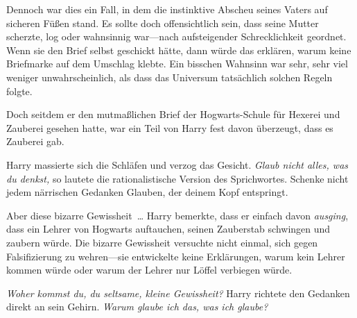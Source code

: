 Dennoch war dies ein Fall, in dem die instinktive Abscheu seines Vaters auf sicheren Füßen stand. Es sollte doch offensichtlich sein, dass seine Mutter scherzte, log oder wahnsinnig war—nach aufsteigender Schrecklichkeit geordnet. Wenn sie den Brief selbst geschickt hätte, dann würde das erklären, warum keine Briefmarke auf dem Umschlag klebte. Ein bisschen Wahnsinn war sehr, sehr viel weniger unwahrscheinlich, als dass das Universum tatsächlich solchen Regeln folgte.

Doch seitdem er den mutmaßlichen Brief der Hogwarts-Schule für Hexerei und Zauberei gesehen hatte, war ein Teil von Harry fest davon überzeugt, dass es Zauberei gab.

Harry massierte sich die Schläfen und verzog das Gesicht. \emph{Glaub nicht alles, was du denkst,} so lautete die rationalistische Version des Sprichwortes. Schenke nicht jedem närrischen Gedanken Glauben, der deinem Kopf entspringt.

Aber diese bizarre Gewissheit … Harry bemerkte, dass er einfach davon \emph{ausging}, dass ein Lehrer von Hogwarts auftauchen, seinen Zauberstab schwingen und zaubern würde. Die bizarre Gewissheit versuchte nicht einmal, sich gegen Falsifizierung zu wehren—sie entwickelte keine Erklärungen, warum kein Lehrer kommen würde oder warum der Lehrer nur Löffel verbiegen würde.

\emph{Woher kommst du, du seltsame, kleine Gewissheit?} Harry richtete den Gedanken direkt an sein Gehirn. \emph{Warum glaube ich das, was ich glaube?}

